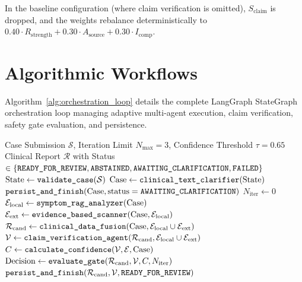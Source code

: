 \documentclass[12pt,a4paper]{report}
\begin{document}
In the baseline configuration (where claim verification is omitted), $S_{\text{claim}}$ is dropped, and the weights rebalance deterministically to $0.40 \cdot R_{\text{strength}} + 0.30 \cdot A_{\text{source}} + 0.30 \cdot I_{\text{comp}}$.

\section{Algorithmic Workflows}
Algorithm~\ref{alg:orchestration_loop} details the complete LangGraph StateGraph orchestration loop managing adaptive multi-agent execution, claim verification, safety gate evaluation, and persistence.

\begin{algorithm}[H]
\caption{Adaptive Multi-Agent Orchestration with Safety Gate and Abstention}
\label{alg:orchestration_loop}
\small
\begin{algorithmic}[1]
\Require Case Submission $\mathcal{S}$, Iteration Limit $N_{\text{max}} = 3$, Confidence Threshold $\tau = 0.65$
\Ensure Clinical Report $\mathcal{R}$ with Status $\in \{\text{\texttt{READY\_FOR\_REVIEW}}, \text{\texttt{ABSTAINED}}, \text{\texttt{AWAITING\_CLARIFICATION}}, \text{\texttt{FAILED}}\}$
\State $\text{State} \gets \text{\texttt{validate\_case}}(\mathcal{S})$
\State $\text{Case} \gets \text{\texttt{clinical\_text\_clarifier}}(\text{State})$
    \State \Return $\text{\texttt{persist\_and\_finish}}(\text{Case}, \text{status} = \text{\texttt{AWAITING\_CLARIFICATION}})$
\EndIf
\State $N_{\text{iter}} \gets 0$
    \State $\mathcal{E}_{\text{local}} \gets \text{\texttt{symptom\_rag\_analyzer}}(\text{Case})$
    \State $\mathcal{E}_{\text{ext}} \gets \text{\texttt{evidence\_based\_scanner}}(\text{Case}, \mathcal{E}_{\text{local}})$
    \State $\mathcal{R}_{\text{cand}} \gets \text{\texttt{clinical\_data\_fusion}}(\text{Case}, \mathcal{E}_{\text{local}} \cup \mathcal{E}_{\text{ext}})$
    \State $\mathcal{V} \gets \text{\texttt{claim\_verification\_agent}}(\mathcal{R}_{\text{cand}}, \mathcal{E}_{\text{local}} \cup \mathcal{E}_{\text{ext}})$
    \State $C \gets \text{\texttt{calculate\_confidence}}(\mathcal{V}, \mathcal{E}, \text{Case})$
    \State $\text{Decision} \gets \text{\texttt{evaluate\_gate}}(\mathcal{R}_{\text{cand}}, \mathcal{V}, C, N_{\text{iter}})$
        \State \Return $\text{\texttt{persist\_and\_finish}}(\mathcal{R}_{\text{cand}}, \mathcal{V}, \text{\texttt{READY\_FOR\_REVIEW}})$

\end{algorithmic}
\end{algorithm}
\end{document}
